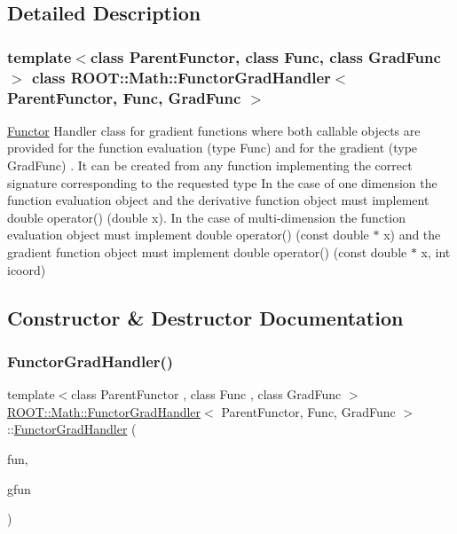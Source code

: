 \subsection{Detailed Description}
\subsubsection*{template$<$class Parent\+Functor, class Func, class Grad\+Func$>$\newline
class R\+O\+O\+T\+::\+Math\+::\+Functor\+Grad\+Handler$<$ Parent\+Functor, Func, Grad\+Func $>$}

\mbox{\hyperlink{classROOT_1_1Math_1_1Functor}{Functor}} Handler class for gradient functions where both callable objects are provided for the function evaluation (type Func) and for the gradient (type Grad\+Func) . It can be created from any function implementing the correct signature corresponding to the requested type In the case of one dimension the function evaluation object and the derivative function object must implement double operator() (double x). In the case of multi-\/dimension the function evaluation object must implement double operator() (const double $\ast$ x) and the gradient function object must implement double operator() (const double $\ast$ x, int icoord) 

\subsection{Constructor \& Destructor Documentation}
\mbox{\label{classROOT_1_1Math_1_1FunctorGradHandler_a139441c0174a37b1385732b0f7602ad7}} 
\subsubsection{\texorpdfstring{FunctorGradHandler()}{FunctorGradHandler()}\hspace{0.1cm}{\footnotesize\ttfamily [1/6]}}
{\footnotesize\ttfamily template$<$class Parent\+Functor , class Func , class Grad\+Func $>$ \\
\mbox{\hyperlink{classROOT_1_1Math_1_1FunctorGradHandler}{R\+O\+O\+T\+::\+Math\+::\+Functor\+Grad\+Handler}}$<$ Parent\+Functor, Func, Grad\+Func $>$\+::\mbox{\hyperlink{classROOT_1_1Math_1_1FunctorGradHandler}{Functor\+Grad\+Handler}} (\begin{DoxyParamCaption}\item[{const Func \&}]{fun,  }\item[{const Grad\+Func \&}]{gfun }\end{DoxyParamCaption})\hspace{0.3cm}{\ttfamily [inline]}}


